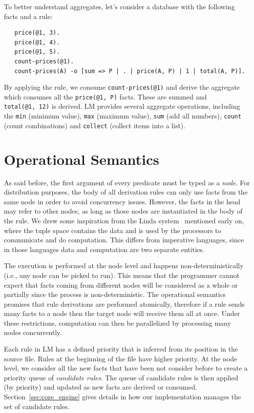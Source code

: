 To better understand aggregates, let's consider a database with the following
facts and a rule:

{\small
\begin{Verbatim}
   price(@1, 3).
   price(@1, 4).
   price(@1, 5).
   count-prices(@1).
   count-prices(A) -o [sum => P | . | price(A, P) | 1 | total(A, P)].
\end{Verbatim}
}

By applying the rule, we consume \texttt{count-prices(@1)} and derive the
aggregate which consumes all the \texttt{price(@1, P)} facts.  These are summed
and \texttt{total(@1,~12)} is derived. LM provides several aggregate operations,
including the \texttt{min} (minimum value), \texttt{max} (maximum value),
\texttt{sum} (add all numbers), \texttt{count} (count combinations) and
\texttt{collect} (collect items into a list).

\section{Operational Semantics}

As said before, the first argument of every predicate must be typed as a
\emph{node}.  For distribution purposes, the body of all derivation rules can
only use facts from the same node in order to avoid concurrency issues.
However, the facts in the head may refer to other nodes, as long as those nodes
are instantiated in the body of the rule.  We drew some inspiration from the
Linda system~\cite{linda} mentioned early on, where the tuple space contains
the data and is used by the processors to communicate and do computation.  This
differs from imperative languages, since in those languages data and computation
are two separate entities.

The execution is performed at the node level and happens non-deterministically
(i.e., any node can be picked to run). This means that the programmer cannot
expect that facts coming from different nodes will be considered as a whole or
partially since the process is non-deterministic. The operational semantics
promises that rule derivations are performed atomically, therefore if a rule
sends many facts to a node then the target node will receive them all at once.
Under these restrictions, computation can then be parallelized by processing
many nodes concurrently.

Each rule in LM has a defined priority that is inferred from its position in the
source file.  Rules at the beginning of the file have higher priority. At the
node level, we consider all the new facts that have been not consider before to
create a priority queue of \emph{candidate rules}.  The queue of candidate rules
is then applied (by priority) and updated as new facts are derived or consumed.
Section~\ref{sec:core_engine} gives details in how our implementation manages
the set of candidate rules.

